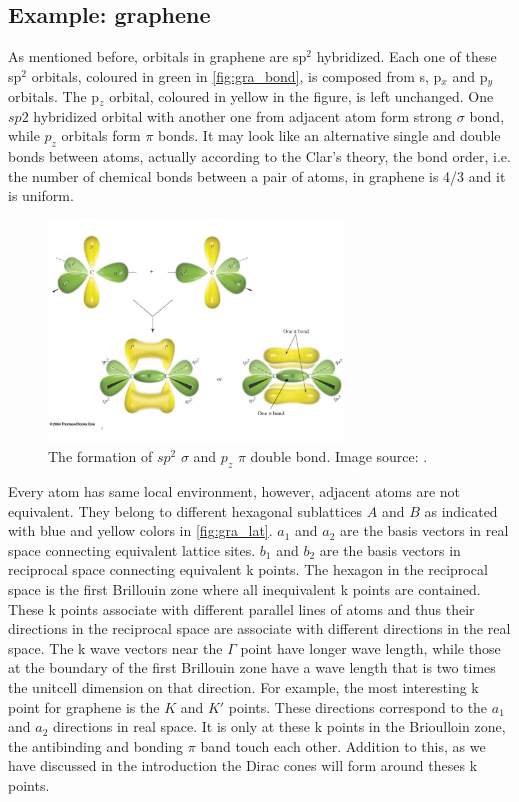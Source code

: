 \subsection{Example: graphene}

As mentioned before, orbitals in graphene are sp$^2$ hybridized. Each one of these sp$^2$ orbitals, coloured in green in \autoref{fig:gra_bond}, is composed from s, p$_x$ and p$_y$ orbitals. The p$_z$ orbital, coloured in yellow in the figure, is left unchanged. One $sp2$ hybridized orbital with another one from adjacent atom form strong $\sigma$ bond, while $p_z$ orbitals form $\pi$ bonds. It may look like an alternative single and double bonds between atoms, actually according to the Clar's theory, the bond order, i.e. the number of chemical bonds between a pair of atoms, in graphene is 4/3 and it is uniform\cite{Wassmann2010}.

\begin{figure}[htbp!] 
\centering  
\includegraphics[width=0.7\textwidth]{double_bond}
\caption{The formation of $sp^2$ $\sigma$ and $p_z$ $\pi$ double bond. Image source: \cite{gra_bond}. }  
\label{fig:gra_bond}
\end{figure} 

Every atom has same local environment, however, adjacent atoms are not equivalent. They belong to different hexagonal sublattices $A$ and $B$ as indicated with blue and yellow colors in \autoref{fig:gra_lat}. $a_1$ and $a_2$ are the basis vectors in real space connecting equivalent lattice sites. $b_1$ and $b_2$ are the basis vectors in reciprocal space connecting equivalent k points. The hexagon in the reciprocal space is the first Brillouin zone where all inequivalent k points are contained. These k points associate with different parallel lines of atoms and thus their directions in the reciprocal space are associate with different directions in the real space. The k wave vectors near the $\Gamma$ point have longer wave length, while those at the boundary of the first Brillouin zone have a wave length that is two times the unitcell dimension on that direction. For example, the most interesting k point for graphene is the $K$ and $K'$ points. These directions correspond to the $a_1$ and $a_2$ directions in real space. It is only at these k points in the Brioulloin zone, the antibinding and bonding $\pi$ band touch each other. Addition to this, as we have discussed in the introduction the Dirac cones will form around theses k points. 


